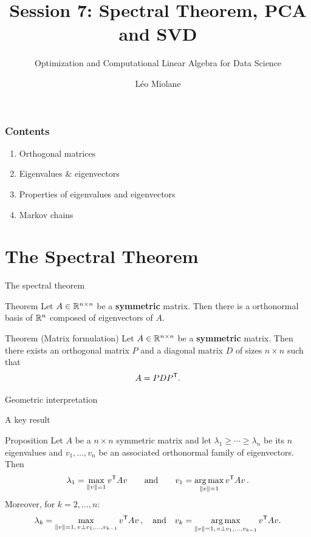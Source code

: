 \documentclass{beamer}
\title{Session 7: Spectral Theorem, PCA and SVD}
\subtitle{Optimization and Computational Linear Algebra for Data Science}
\author{Léo Miolane}
\date{}
\begin{document}
\setcounter{showProgressBar}{0}
\setcounter{showSlideNumbers}{0}

\frame{\titlepage}

\begin{frame}
	\frametitle{Contents}
	\begin{enumerate}
		\item Orthogonal matrices
		\item Eigenvalues \& eigenvectors
		\item Properties of eigenvalues and eigenvectors
		\item Markov chains
	\end{enumerate}
\end{frame}


\setcounter{framenumber}{0}
\setcounter{showSlideNumbers}{1}

\section{The Spectral Theorem}

\begin{frame}[t]{The spectral theorem}
	\grid

	\vspace{-0.3cm}
	\begin{block}{Theorem}
		Let $A \in \mathbb{R}^{n \times n}$ be a \textbf{symmetric} matrix. Then there is a orthonormal basis of $\mathbb{R}^n$ composed of eigenvectors of $A$.
	\end{block}

	\vspace{1.3cm}
	\begin{block}{Theorem (Matrix formulation)}
		Let $A \in \mathbb{R}^{n \times n}$ be a \textbf{symmetric} matrix. Then there exists an orthogonal matrix $P$ and a diagonal matrix $D$ of sizes $n \times n$ such that
		$$
		A = P D P^{{\sf T}}.
		$$
	\end{block}
\end{frame}

\begin{frame}[t]{Geometric interpretation}
	\grid

\end{frame}

\begin{frame}[t]{A key result}
	\grid

	\vspace{-0.4cm}
	\begin{block}{Proposition}
		Let $A$ be a $n \times n$ symmetric matrix and let $\lambda_1 \geq \cdots \geq \lambda_n$ be its $n$ eigenvalues and $v_1, \dots, v_n$ be an associated orthonormal family of eigenvectors. Then 
		$$
		\lambda_1 = \max_{\|v\| = 1} v^{{\sf T}} A v
		\qquad \text{and} \qquad
		v_1 = \operatorname*{arg\,max}_{\|v\| = 1} v^{{\sf T}} A v\,.
		$$
		Moreover, for $k=2,\dots,n$:
		$$
		\lambda_{k} = \max_{\|v\| = 1, \, v \perp v_1, \dots, v_{k-1}} v^{{\sf T}} A v\,,
		\quad \text{and} \quad
		v_{k} = \operatorname*{arg\,max}_{\|v\| = 1, \, v \perp v_1, \dots, v_{k-1}} v^{{\sf T}} A v.
		$$
	\end{block}
\end{frame}
\end{document}
